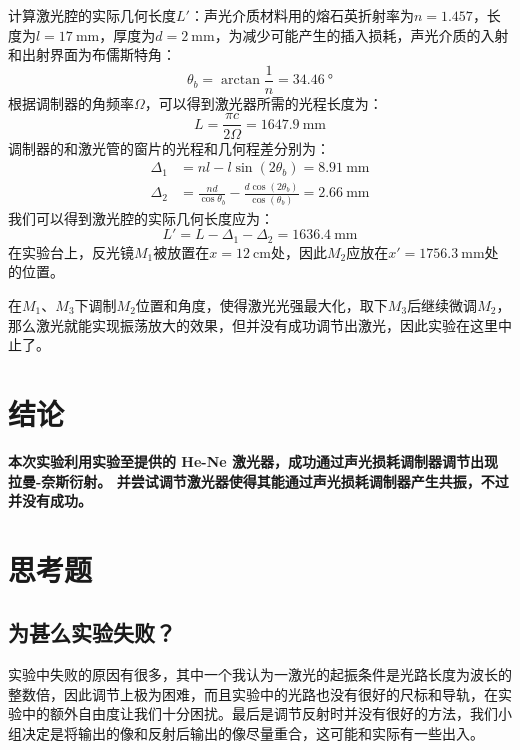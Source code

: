 \documentclass[font=default]{mpltx}
\newcommand{\note}[1]{{\color{gray}#1}}
\begin{document}
计算激光腔的实际几何长度$L'$：声光介质材料用的熔石英折射率为$n=1.457$，长度为$l=\qty{17}{\mm}$，厚度为$d=\qty{2}{\mm}$，为减少可能产生的插入损耗，声光介质的入射和出射界面为布儒斯特角：
$$\theta_b=\arctan{\frac{1}{n}=\qty{34.46}{\degree}}$$
根据调制器的角频率$\Omega$，可以得到激光器所需的光程长度为：
$$L=\frac{\pi c}{2\Omega}=\qty{1647.9}{\mm}$$
调制器的和激光管的窗片的光程和几何程差分别为：
$$\begin{aligned}
	\Delta_1 &= nl-l\sin{(2\theta_b)}=\qty{8.91}{\mm} \\
	\Delta_2 &= \frac{nd}{\cos{\theta_b}}-\frac{d\cos{(2\theta_b)}}{\cos{(\theta_b)}} = \qty{2.66}{\mm}	
\end{aligned}$$
我们可以得到激光腔的实际几何长度应为：
$$L'=L-\Delta_1-\Delta_2=\qty{1636.4}{\mm}$$
在实验台上，反光镜$M_1$被放置在$x=\qty{12}{\cm}$处，因此$M_2$应放在$x'= \qty{1756.3}{\mm}$处的位置。\par
在$M_1$、$M_3$下调制$M_2$位置和角度，使得激光光强最大化，取下$M_3$后继续微调$M_2$，那么激光就能实现振荡放大的效果，但并没有成功调节出激光，因此实验在这里中止了。




\section{结论}
\textbf{本次实验利用实验至提供的 He-Ne 激光器，成功通过声光损耗调制器调节出现拉曼-奈斯衍射。
并尝试调节激光器使得其能通过声光损耗调制器产生共振，不过并没有成功。}



\clearpage %
\appendix %
\section{思考题}\label{app:exercise}
\subsection{为甚么实验失败？}
实验中失败的原因有很多，其中一个我认为一激光的起振条件是光路长度为波长的整数倍，因此调节上极为困难，而且实验中的光路也没有很好的尺标和导轨，在实验中的额外自由度让我们十分困扰。最后是调节反射时并没有很好的方法，我们小组决定是将输出的像和反射后输出的像尽量重合，这可能和实际有一些出入。
\end{document}
